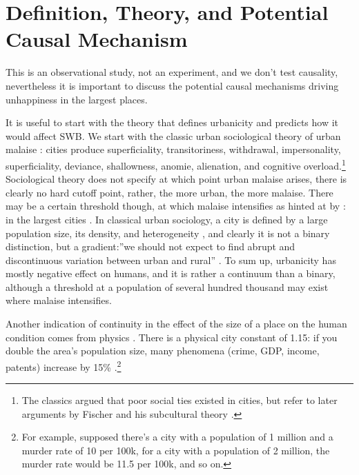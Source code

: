 \documentclass[10pt, letterpaper]{article}
\begin{document}
\section*{Definition, Theory, and Potential Causal Mechanism}

This is an observational study, not an experiment, and we don't test causality, nevertheless it is important to discuss the potential causal mechanisms driving unhappiness in the largest places.

It is useful to start with the theory that defines urbanicity and predicts how it would affect SWB. 
We start with the classic urban sociological theory of urban malaise
 \citep{tonnies57,wirth38,simmel03,park15,park84}: cities produce superficiality,
transitoriness, withdrawal, impersonality, superficiality, deviance,
shallowness, anomie, alienation, and cognitive overload.\footnote{The classics
  argued that poor social ties existed in cities, but refer to later arguments by Fischer and his subcultural theory \citep{fischer95,fischer75,fischer72}.} 
Sociological theory does not specify at which point urban malaise arises, there is clearly no hard
cutoff point, rather, the more urban, the more malaise. There may be a certain
threshold though, at which malaise intensifies as hinted at by
\citet{fischer73}: in the largest cities%
.
In classical urban sociology, a city is defined by a large population size, its density,
and heterogeneity \citep{wirth38}, and clearly it is not a binary distinction,
but a gradient:''we should not expect to find abrupt and discontinuous variation
between urban and rural'' \citep[][p. 2]{wirth38}. To sum up, urbanicity has mostly negative
effect on humans, and it is rather a continuum than a binary, although a threshold
at a population of several hundred thousand may exist where malaise intensifies.

Another indication of continuity in the effect of the size of a place on the human condition
comes from physics%
. There is a physical city constant of 1.15: if you double the area's population size, many phenomena (crime, GDP, income, patents) increase by 15\% \citep{blissCL_nov4_14,bettencourt10,bettencourt10b,bettencourt07}.\footnote{For example, supposed there's a city with a population of 1 million and a murder rate of 10 per 100k, for a city with a population of 2 million, the murder rate would be 11.5 per 100k, and so on.} 
\end{document}
